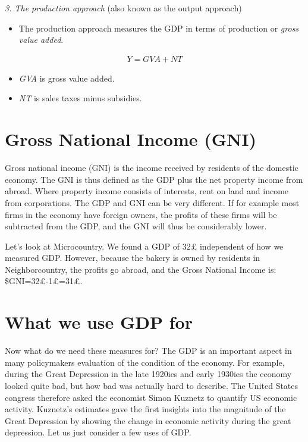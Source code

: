 \documentclass[
]{book}
\providecommand{\tightlist}{%
  \setlength{\itemsep}{0pt}\setlength{\parskip}{0pt}}
\begin{document}
\begin{myblock}
\emph{3. The production approach} (also known as the output approach)

\begin{itemize}
\tightlist
\item
  The production approach measures the GDP in terms of production or
  \emph{gross value added}.
\end{itemize}

\begin{align}
  Y=GVA+NT
\end{align}

\begin{itemize}
\tightlist
\item
  \emph{GVA} is gross value added.
\item
  \emph{NT} is sales taxes minus subsidies.
\end{itemize}
\end{myblock}

\hypertarget{gross-national-income-gni}{%
\section{Gross National Income (GNI)}\label{gross-national-income-gni}}

Gross national income (GNI) is the income received by residents of the domestic economy. The GNI is thus defined as the GDP plus the net property income from abroad. Where property income consists of interests, rent on land and income from corporations. The GDP and GNI can be very different. If for example most firms in the economy have foreign owners, the profits of these firms will be subtracted from the GDP, and the GNI will thus be considerably lower.

Let's look at Microcountry. We found a GDP of 32£ independent of how we measured GDP. However, because the bakery is owned by residents in Neighborcountry, the profits go abroad, and the Gross National Income is: \$GNI=32£-1£=31£.

\hypertarget{what-we-use-gdp-for}{%
\section{What we use GDP for}\label{what-we-use-gdp-for}}

Now what do we need these measures for? The GDP is an important aspect in many policymakers evaluation of the condition of the economy. For example, during the Great Depression in the late 1920ies and early 1930ies the economy looked quite bad, but how bad was actually hard to describe. The United States congress therefore asked the economist Simon Kuznetz to quantify US economic activity. Kuznetz's estimates gave the first insights into the magnitude of the Great Depression by showing the change in economic activity during the great depression. Let us just consider a few uses of GDP.
\end{document}

